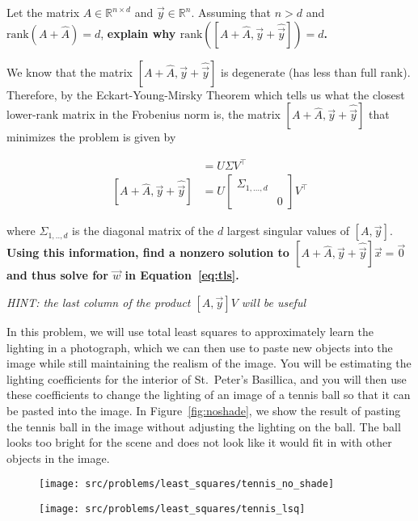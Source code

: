 \begin{Parts}

\Part Let the matrix $A\in\mathbb{R}^{n\times d}$ and $\vec{y}\in\mathbb{R}^n$.  Assuming that $n>d$ and $\text{rank}(A+\hat{A})=d$, \textbf{explain why $\text{rank}([A+\hat{A},\vec{y}+\hat{\vec{y}}])=d$.}



\Part We know that the matrix $[A+\hat{A},\vec{y}+\hat{\vec{y}}]$ is degenerate (has less than full rank).  Therefore, by the Eckart-Young-Mirsky Theorem which tells us what the closest lower-rank matrix in the Frobenius norm is, the matrix $[A+\hat{A},\vec{y}+\hat{\vec{y}}]$ that minimizes the problem is given by

\begin{align*}
[A,\vec{y}]&=U\Sigma V^\top\\
[A+\hat{A},\vec{y}+\hat{\vec{y}}]&=U
\begin{bmatrix}
\Sigma_{1,...,d}&\\&0
\end{bmatrix}
V^\top
\end{align*}

where $\Sigma_{1,..,d}$ is the diagonal matrix of the $d$ largest singular values of $[A,\vec{y}]$.  \textbf{Using this information, find a nonzero solution to $[A+\hat{A},\vec{y}+\hat{\vec{y}}]\vec{x}=\vec{0}$ and thus solve for $\vec{w}$ in Equation~\ref{eq:tls}.}

\emph{HINT: the last column of the product $[A,\vec{y}]V$ will be useful}



\Part In this problem, we will use total least squares to approximately learn the lighting in a photograph, which we can then use to paste new objects into the image while still maintaining the realism of the image.  You will be estimating the lighting coefficients for the interior of St.~Peter's Basillica, and you will then use these coefficients to change the lighting of an image of a tennis ball so that it can be pasted into the image.  In Figure~\ref{fig:noshade}, we show the result of pasting the tennis ball in the image without adjusting the lighting on the ball.  The ball looks too bright for the scene and does not look like it would fit in with other objects in the image.

\begin{figure}
\centering
  \begin{minipage}[b]{0.4\textwidth}
  \texttt{[image: src/problems/least\_squares/tennis\_no\_shade]}
  \end{minipage}
    \begin{minipage}[b]{0.4\textwidth}
  \texttt{[image: src/problems/least\_squares/tennis\_lsq]}
  \end{minipage}


\end{figure}
\end{Parts}
